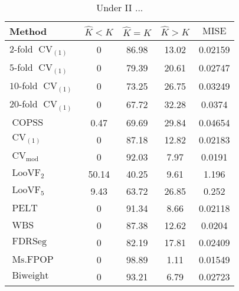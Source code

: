 \begin{table}[ht]
\centering
\begin{tabular}{|l|cccc|}
  \hline
Method & $\hat{K} < K$ & $\hat{K} = K$ & $\hat{K} > K$ & $\operatorname{MISE}$ \\ 
  \hline
$2$-fold $\operatorname{CV}_{(1)}$ &     0 & 86.98 & 13.02 & 0.02159 \\ 
  $5$-fold $\operatorname{CV}_{(1)}$ &     0 & 79.39 & 20.61 & 0.02747 \\ 
  $10$-fold $\operatorname{CV}_{(1)}$ &     0 & 73.25 & 26.75 & 0.03249 \\ 
  $20$-fold $\operatorname{CV}_{(1)}$ &     0 & 67.72 & 32.28 & 0.0374 \\ 
  $\operatorname{COPSS}$ &  0.47 & 69.69 & 29.84 & 0.04654 \\ 
  $\operatorname{CV}_{(1)}$ &     0 & 87.18 & 12.82 & 0.02183 \\ 
  $\operatorname{CV}_{\operatorname{mod}}$ &     0 & 92.03 &  7.97 & 0.0191 \\ 
  $\operatorname{LooVF}_2$ & 50.14 & 40.25 &  9.61 & 1.196 \\ 
  $\operatorname{LooVF}_5$ &  9.43 & 63.72 & 26.85 & 0.252 \\ 
  $\operatorname{PELT}$ &     0 & 91.34 &  8.66 & 0.02118 \\ 
  $\operatorname{WBS}$ &     0 & 87.38 & 12.62 & 0.0204 \\ 
  $\operatorname{FDRSeg}$ &     0 & 82.19 & 17.81 & 0.02409 \\ 
  $\operatorname{Ms.FPOP}$ &     0 & 98.89 &  1.11 & 0.01549 \\ 
  $\operatorname{Biweight}$ &     0 & 93.21 &  6.79 & 0.02723 \\ 
   \hline
\end{tabular}
\caption{Under II ...} 
\end{table}
